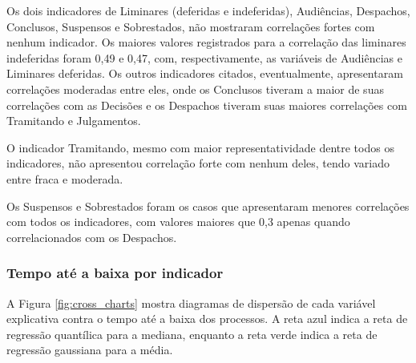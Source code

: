 Os dois indicadores de Liminares (deferidas e indeferidas), Audiências, Despachos, Conclusos, Suspensos e Sobrestados, não mostraram correlações fortes com nenhum indicador. Os maiores valores registrados para a correlação das liminares indeferidas foram 0,49 e 0,47, com, respectivamente, as variáveis de Audiências e Liminares deferidas. Os outros indicadores citados, eventualmente, apresentaram correlações moderadas entre eles, onde os Conclusos tiveram a maior de suas correlações com as Decisões e os Despachos tiveram suas maiores correlações com Tramitando e Julgamentos.

O indicador Tramitando, mesmo com maior representatividade dentre todos os indicadores, não apresentou correlação forte com nenhum deles, tendo variado entre fraca e moderada.

Os Suspensos e Sobrestados foram os casos que apresentaram menores correlações com todos os indicadores, com valores maiores que 0,3 apenas quando correlacionados com os Despachos.

\subsubsection{Tempo até a baixa por indicador}

A Figura \ref{fig:cross_charts} mostra diagramas de dispersão de cada variável explicativa contra o tempo até a baixa dos processos. A reta azul indica a reta de regressão quantílica para a mediana, enquanto a reta verde indica a reta de regressão gaussiana para a média.

